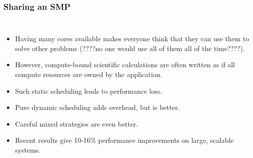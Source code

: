\begin{frame}
\frametitle{Sharing an SMP} 
\begin{columns} %
\begin{itemize}
\tiny \item \tiny Having many cores available makes everyone think that 
they can use them to solve other problems (????no one would use all of them all of the time????).  \\
\item \tiny However, compute-bound scientific calculations are often written as if all compute 
resources are owned by the application. \\
\item \tiny  Such static scheduling leads to performance loss. \\
 \item \tiny Pure dynamic scheduling adds overhead, but is better. \\
\item \tiny  Careful mixed strategies are even better. \\
\item \tiny Recent results give 10-16\% performance improvements on large, scalable systems. \\ 
\end{itemize}
\end{columns} 
\end{frame} 

